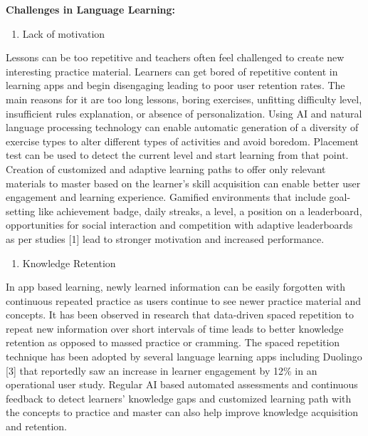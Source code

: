 \documentclass[
]{book}
\providecommand{\tightlist}{%
  \setlength{\itemsep}{0pt}\setlength{\parskip}{0pt}}
\begin{document}
\textbf{Challenges in Language Learning:}

\begin{enumerate}
\def\labelenumi{\arabic{enumi}.}
\tightlist
\item
  Lack of motivation
\end{enumerate}

Lessons can be too repetitive and teachers often feel challenged to create new interesting practice material. Learners can get bored of repetitive content in learning apps and begin disengaging leading to poor user retention rates. The main reasons for it are too long lessons, boring exercises, unfitting difficulty level, insufficient rules explanation, or absence of personalization. Using AI and natural language processing technology can enable automatic generation of a diversity of exercise types to alter different types of activities and avoid boredom. Placement test can be used to detect the current level and start learning from that point. Creation of customized and adaptive learning paths to offer only relevant materials to master based on the learner's skill acquisition can enable better user engagement and learning experience. Gamified environments that include goal-setting like achievement badge, daily streaks, a level, a position on a leaderboard, opportunities for social interaction and competition with adaptive leaderboards as per studies {[}1{]} lead to stronger motivation and increased performance.

\begin{enumerate}
\def\labelenumi{\arabic{enumi}.}
\setcounter{enumi}{1}
\tightlist
\item
  Knowledge Retention
\end{enumerate}

In app based learning, newly learned information can be easily forgotten with continuous repeated practice as users continue to see newer practice material and concepts. It has been observed in research that data-driven spaced repetition to repeat new information over short intervals of time leads to better knowledge retention as opposed to massed practice or cramming. The spaced repetition technique has been adopted by several language learning apps including Duolingo {[}3{]} that reportedly saw an increase in learner engagement by 12\% in an operational user study. Regular AI based automated assessments and continuous feedback to detect learners' knowledge gaps and customized learning path with the concepts to practice and master can also help improve knowledge acquisition and retention.
\end{document}
